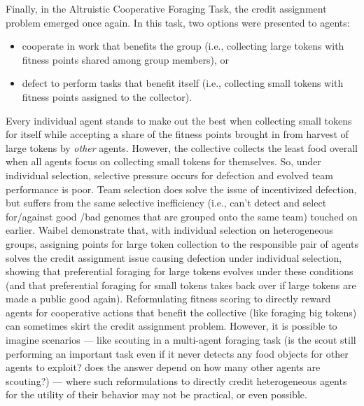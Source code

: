 Finally, in the Altruistic Cooperative Foraging Task, the credit assignment problem emerged once again.
In this task, two options were presented to agents:
\begin{itemize}
\item cooperate in work that benefits the group (i.e., collecting large tokens with fitness points shared among group members), or
\item defect to perform tasks that benefit itself (i.e., collecting small tokens with fitness points assigned to the collector).
\end{itemize}
Every individual agent stands to make out the best when collecting small tokens for itself while accepting a share of the fitness points brought in from harvest of large tokens by \textit{other} agents.
However, the collective collects the least food overall when all agents focus on collecting small tokens for themselves.
So, under individual selection, selective pressure occurs for defection and evolved team performance is poor.
Team selection does solve the issue of incentivized defection, but suffers from the same selective inefficiency (i.e., can't detect and select for/against good /bad genomes that are grouped onto the same team) touched on earlier.
Waibel demonstrate that, with individual selection on heterogeneous groups, assigning points for large token collection to the responsible pair of agents solves the credit assignment issue causing defection under individual selection, showing that preferential foraging for large tokens evolves under these conditions (and that preferential foraging for small tokens takes back over if large tokens are made a public good again).
Reformulating fitness scoring to directly reward agents for cooperative actions that benefit the collective (like foraging big tokens) can sometimes skirt the credit assignment problem.
However, it is possible to imagine scenarios --- like scouting in a multi-agent foraging task (is the scout still performing an important task even if it never detects any food objects for other agents to exploit? does the answer depend on how many other agents are scouting?) --- where such reformulations to directly credit heterogeneous agents for the utility of their behavior may not be practical, or even possible.

